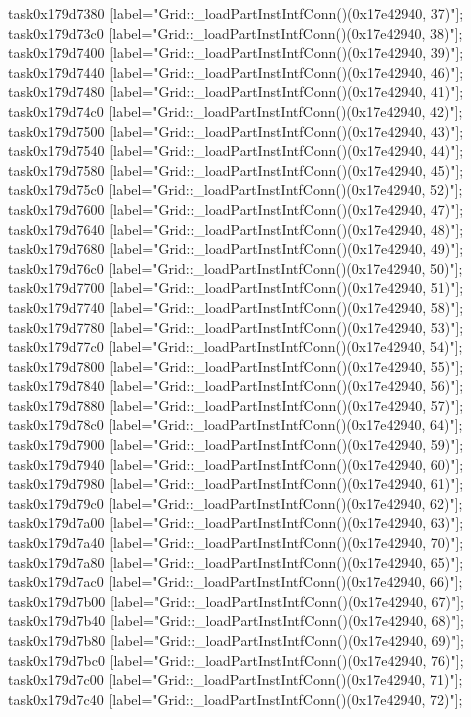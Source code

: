 {	task0x179d7380 [label="Grid::_loadPartInstIntfConn()(0x17e42940, 37)"];
	task0x179d73c0 [label="Grid::_loadPartInstIntfConn()(0x17e42940, 38)"];
	task0x179d7400 [label="Grid::_loadPartInstIntfConn()(0x17e42940, 39)"];
	task0x179d7440 [label="Grid::_loadPartInstIntfConn()(0x17e42940, 46)"];
	task0x179d7480 [label="Grid::_loadPartInstIntfConn()(0x17e42940, 41)"];
	task0x179d74c0 [label="Grid::_loadPartInstIntfConn()(0x17e42940, 42)"];
	task0x179d7500 [label="Grid::_loadPartInstIntfConn()(0x17e42940, 43)"];
	task0x179d7540 [label="Grid::_loadPartInstIntfConn()(0x17e42940, 44)"];
	task0x179d7580 [label="Grid::_loadPartInstIntfConn()(0x17e42940, 45)"];
	task0x179d75c0 [label="Grid::_loadPartInstIntfConn()(0x17e42940, 52)"];
	task0x179d7600 [label="Grid::_loadPartInstIntfConn()(0x17e42940, 47)"];
	task0x179d7640 [label="Grid::_loadPartInstIntfConn()(0x17e42940, 48)"];
	task0x179d7680 [label="Grid::_loadPartInstIntfConn()(0x17e42940, 49)"];
	task0x179d76c0 [label="Grid::_loadPartInstIntfConn()(0x17e42940, 50)"];
	task0x179d7700 [label="Grid::_loadPartInstIntfConn()(0x17e42940, 51)"];
	task0x179d7740 [label="Grid::_loadPartInstIntfConn()(0x17e42940, 58)"];
	task0x179d7780 [label="Grid::_loadPartInstIntfConn()(0x17e42940, 53)"];
	task0x179d77c0 [label="Grid::_loadPartInstIntfConn()(0x17e42940, 54)"];
	task0x179d7800 [label="Grid::_loadPartInstIntfConn()(0x17e42940, 55)"];
	task0x179d7840 [label="Grid::_loadPartInstIntfConn()(0x17e42940, 56)"];
	task0x179d7880 [label="Grid::_loadPartInstIntfConn()(0x17e42940, 57)"];
	task0x179d78c0 [label="Grid::_loadPartInstIntfConn()(0x17e42940, 64)"];
	task0x179d7900 [label="Grid::_loadPartInstIntfConn()(0x17e42940, 59)"];
	task0x179d7940 [label="Grid::_loadPartInstIntfConn()(0x17e42940, 60)"];
	task0x179d7980 [label="Grid::_loadPartInstIntfConn()(0x17e42940, 61)"];
	task0x179d79c0 [label="Grid::_loadPartInstIntfConn()(0x17e42940, 62)"];
	task0x179d7a00 [label="Grid::_loadPartInstIntfConn()(0x17e42940, 63)"];
	task0x179d7a40 [label="Grid::_loadPartInstIntfConn()(0x17e42940, 70)"];
	task0x179d7a80 [label="Grid::_loadPartInstIntfConn()(0x17e42940, 65)"];
	task0x179d7ac0 [label="Grid::_loadPartInstIntfConn()(0x17e42940, 66)"];
	task0x179d7b00 [label="Grid::_loadPartInstIntfConn()(0x17e42940, 67)"];
	task0x179d7b40 [label="Grid::_loadPartInstIntfConn()(0x17e42940, 68)"];
	task0x179d7b80 [label="Grid::_loadPartInstIntfConn()(0x17e42940, 69)"];
	task0x179d7bc0 [label="Grid::_loadPartInstIntfConn()(0x17e42940, 76)"];
	task0x179d7c00 [label="Grid::_loadPartInstIntfConn()(0x17e42940, 71)"];
	task0x179d7c40 [label="Grid::_loadPartInstIntfConn()(0x17e42940, 72)"];
}
